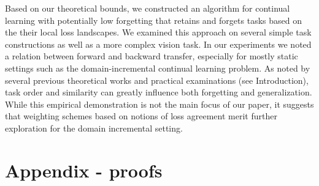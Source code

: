 \documentclass{article}
\theoremstyle{plain}
\theoremstyle{definition}
\theoremstyle{remark}
\begin{document}
Based on our theoretical bounds, we constructed an algorithm for continual learning with potentially low forgetting that retains and forgets tasks based on the their local loss landscapes. We examined this approach on several simple task constructions as well as a more complex vision task. In our experiments we noted a relation between forward and backward transfer, especially for mostly static settings such as the domain-incremental continual learning problem. As noted by several previous theoretical works and practical examinations (see Introduction), task order and similarity can greatly influence both forgetting and generalization. While this empirical demonstration is not the main focus of our paper, it suggests that weighting schemes based on notions of loss agreement merit further exploration for the domain incremental setting.


\clearpage



\newpage
\appendix
\onecolumn

\section{Appendix - proofs} \label{append:proofs}

\end{document}
